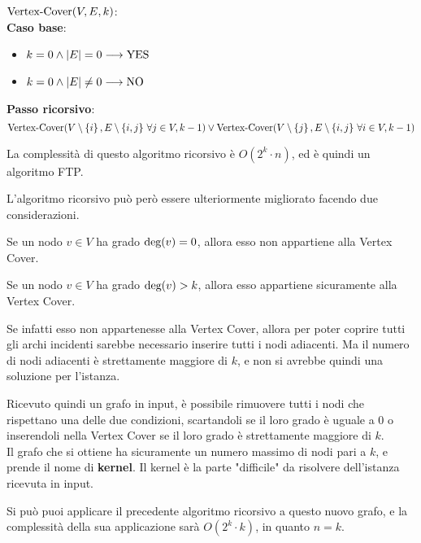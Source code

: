 $\textnormal{Vertex-Cover}(V, E, k)$:\\
\textbf{Caso base}:
    \begin{minipage}[t]
    {0.8\linewidth}\begin{itemize}
        \setlength\itemsep{0em}
        \item $k = 0 \land |E| = 0 \longrightarrow \textnormal{YES}$
        \item $k = 0 \land |E| \neq 0 \longrightarrow \textnormal{NO}$
    \end{itemize}\end{minipage}

\textbf{Passo ricorsivo}:
    \[
        \textnormal{Vertex-Cover}(V \setminus \left\{i\right\}, E \setminus \left\{i, j\right\}
        \, \forall j \in V, k-1) \lor
        \textnormal{Vertex-Cover}(V \setminus \left\{j\right\}, E \setminus \left\{i, j\right\}
        \, \forall i \in V, k-1)
    \]

La complessità di questo algoritmo ricorsivo è $O(2^k \cdot n)$, ed è
quindi un algoritmo FTP.

L'algoritmo ricorsivo può però essere ulteriormente migliorato facendo
due considerazioni.
\begin{property}
    Se un nodo $v \in V$ ha grado $\textnormal{deg}(v) = 0$, allora esso non
    appartiene alla Vertex Cover.
\end{property}

\begin{property}
    Se un nodo $v \in V$ ha grado $\textnormal{deg}(v) > k$, allora esso
    appartiene sicuramente alla Vertex Cover.
\end{property}
Se infatti esso non appartenesse alla Vertex Cover, allora per
poter coprire tutti gli archi incidenti sarebbe necessario
inserire tutti i nodi adiacenti. Ma il numero di nodi adiacenti è
strettamente maggiore di $k$, e non si avrebbe quindi una
soluzione per l'istanza.

Ricevuto quindi un grafo in input, è possibile rimuovere tutti i nodi
che rispettano una delle due condizioni, scartandoli se il loro grado
è uguale a $0$ o inserendoli nella Vertex Cover se il loro grado è
strettamente maggiore di $k$.\\
Il grafo che si ottiene ha sicuramente un numero massimo di nodi pari a
$k$, e prende il nome di \textbf{kernel}.
Il kernel è la parte "difficile" da risolvere dell'istanza ricevuta in
input.

Si può puoi applicare il precedente algoritmo ricorsivo a questo nuovo
grafo, e la complessità della sua applicazione sarà $O(2^k \cdot k)$, in
quanto $n = k$.

